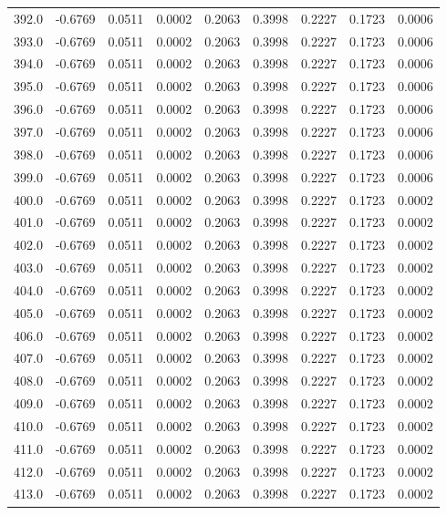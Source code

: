 \begin{longtable}{lrrrrrrrr}
392.0 & -0.6769 & 0.0511 & 0.0002 & 0.2063 & 0.3998 & 0.2227 & 0.1723 & 0.0006 \\
393.0 & -0.6769 & 0.0511 & 0.0002 & 0.2063 & 0.3998 & 0.2227 & 0.1723 & 0.0006 \\
394.0 & -0.6769 & 0.0511 & 0.0002 & 0.2063 & 0.3998 & 0.2227 & 0.1723 & 0.0006 \\
395.0 & -0.6769 & 0.0511 & 0.0002 & 0.2063 & 0.3998 & 0.2227 & 0.1723 & 0.0006 \\
396.0 & -0.6769 & 0.0511 & 0.0002 & 0.2063 & 0.3998 & 0.2227 & 0.1723 & 0.0006 \\
397.0 & -0.6769 & 0.0511 & 0.0002 & 0.2063 & 0.3998 & 0.2227 & 0.1723 & 0.0006 \\
398.0 & -0.6769 & 0.0511 & 0.0002 & 0.2063 & 0.3998 & 0.2227 & 0.1723 & 0.0006 \\
399.0 & -0.6769 & 0.0511 & 0.0002 & 0.2063 & 0.3998 & 0.2227 & 0.1723 & 0.0006 \\
400.0 & -0.6769 & 0.0511 & 0.0002 & 0.2063 & 0.3998 & 0.2227 & 0.1723 & 0.0002 \\
401.0 & -0.6769 & 0.0511 & 0.0002 & 0.2063 & 0.3998 & 0.2227 & 0.1723 & 0.0002 \\
402.0 & -0.6769 & 0.0511 & 0.0002 & 0.2063 & 0.3998 & 0.2227 & 0.1723 & 0.0002 \\
403.0 & -0.6769 & 0.0511 & 0.0002 & 0.2063 & 0.3998 & 0.2227 & 0.1723 & 0.0002 \\
404.0 & -0.6769 & 0.0511 & 0.0002 & 0.2063 & 0.3998 & 0.2227 & 0.1723 & 0.0002 \\
405.0 & -0.6769 & 0.0511 & 0.0002 & 0.2063 & 0.3998 & 0.2227 & 0.1723 & 0.0002 \\
406.0 & -0.6769 & 0.0511 & 0.0002 & 0.2063 & 0.3998 & 0.2227 & 0.1723 & 0.0002 \\
407.0 & -0.6769 & 0.0511 & 0.0002 & 0.2063 & 0.3998 & 0.2227 & 0.1723 & 0.0002 \\
408.0 & -0.6769 & 0.0511 & 0.0002 & 0.2063 & 0.3998 & 0.2227 & 0.1723 & 0.0002 \\
409.0 & -0.6769 & 0.0511 & 0.0002 & 0.2063 & 0.3998 & 0.2227 & 0.1723 & 0.0002 \\
410.0 & -0.6769 & 0.0511 & 0.0002 & 0.2063 & 0.3998 & 0.2227 & 0.1723 & 0.0002 \\
411.0 & -0.6769 & 0.0511 & 0.0002 & 0.2063 & 0.3998 & 0.2227 & 0.1723 & 0.0002 \\
412.0 & -0.6769 & 0.0511 & 0.0002 & 0.2063 & 0.3998 & 0.2227 & 0.1723 & 0.0002 \\
413.0 & -0.6769 & 0.0511 & 0.0002 & 0.2063 & 0.3998 & 0.2227 & 0.1723 & 0.0002 \\

\end{longtable}
